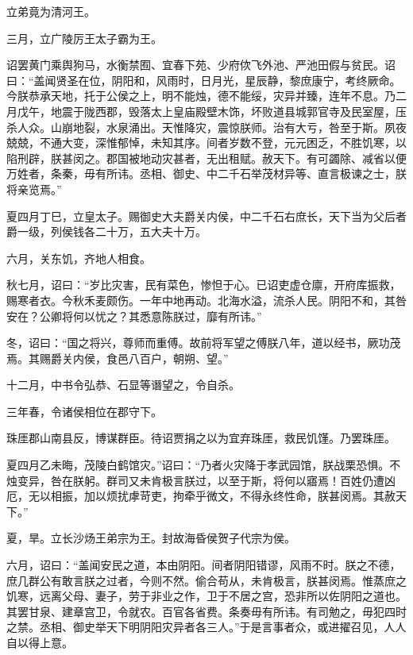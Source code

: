 \documentclass[12pt,UTF8]{ctexbook}
\begin{document}
立弟竟为清河王。



三月，立广陵厉王太子霸为王。



诏罢黄门乘舆狗马，水衡禁囿、宜春下苑、少府佽飞外池、严池田假与贫民。诏曰：“盖闻贤圣在位，阴阳和，风雨时，日月光，星辰静，黎庶康宁，考终厥命。今朕恭承天地，托于公侯之上，明不能烛，德不能绥，灾异并臻，连年不息。乃二月戊午，地震于陇西郡，毁落太上皇庙殿壁木饰，坏败道县城郭官寺及民室屋，压杀人众。山崩地裂，水泉涌出。天惟降灾，震惊朕师。治有大亏，咎至于斯。夙夜兢兢，不通大变，深惟郁悼，未知其序。间者岁数不登，元元困乏，不胜饥寒，以陷刑辟，朕甚闵之。郡国被地动灾甚者，无出租赋。赦天下。有可蠲除、减省以便万姓者，条秦，毋有所讳。丞相、御史、中二千石举茂材异等、直言极谏之士，朕将亲览焉。”



夏四月丁巳，立皇太子。赐御史大夫爵关内侯，中二千石右庶长，天下当为父后者爵一级，列侯钱各二十万，五大夫十万。



六月，关东饥，齐地人相食。



秋七月，诏曰：“岁比灾害，民有菜色，惨怛于心。已诏吏虚仓廪，开府库振救，赐寒者衣。今秋禾麦颇伤。一年中地再动。北海水溢，流杀人民。阴阳不和，其咎安在？公卿将何以忧之？其悉意陈朕过，靡有所讳。”



冬，诏曰：“国之将兴，尊师而重傅。故前将军望之傅朕八年，道以经书，厥功茂焉。其赐爵关内侯，食邑八百户，朝朔、望。”



十二月，中书令弘恭、石显等谮望之，令自杀。



三年春，令诸侯相位在郡守下。



珠厓郡山南县反，博谋群臣。待诏贾捐之以为宜弃珠厓，救民饥馑。乃罢珠厓。



夏四月乙未晦，茂陵白鹤馆灾。”诏曰：“乃者火灾降于孝武园馆，朕战栗恐惧。不烛变异，咎在朕躬。群司又未肯极言朕过，以至于斯，将何以寤焉！百姓仍遭凶厄，无以相振，加以烦扰虖苛吏，拘牵乎微文，不得永终性命，朕甚闵焉。其赦天下。”



夏，旱。立长沙炀王弟宗为王。封故海昏侯贺子代宗为侯。



六月，诏曰：“盖闻安民之道，本由阴阳。间者阴阳错谬，风雨不时。朕之不德，庶几群公有敢言朕之过者，今则不然。偷合苟从，未肯极言，朕甚闵焉。惟蒸庶之饥寒，远离父母、妻子，劳于非业之作，卫于不居之宫，恐非所以佐阴阳之道也。其罢甘泉、建章宫卫，令就农。百官各省费。条奏毋有所讳。有司勉之，毋犯四时之禁。丞相、御史举天下明阴阳灾异者各三人。”于是言事者众，或进擢召见，人人自以得上意。
\end{document}
